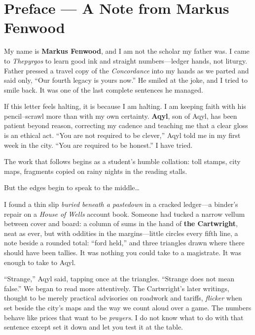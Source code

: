 \documentclass[11pt]{article}
\begin{document}
\section*{Preface — A Note from Markus Fenwood}
\label{sec:preface-markus}
{}

My name is \textbf{Markus Fenwood}, and I am not the scholar my father was. I came to \textit{Thepyrgos} to learn good ink and straight numbers—ledger hands, not liturgy. Father pressed a travel copy of the \emph{Concordance} into my hands as we parted and said only, ``Our fourth legacy is yours now.'' He smiled at the joke, and I tried to smile back. It was one of the last complete sentences he managed.

If this letter feels halting, it is because I am halting. I am keeping faith with his pencil--scrawl more than with my own certainty. \textbf{Aqyl}, son of Aqyl, has been patient beyond reason, correcting my cadence and teaching me that a clear gloss is an ethical act. ``You are not required to be clever,'' Aqyl told me in my first week in the city. ``You are required to be honest.'' I have tried.

The work that follows begins as a student's humble collation: toll stamps, city maps, fragments copied on rainy nights in the reading stalls.

But the edges begin to speak to the middle\ldots{}

I found a thin slip \textit{buried beneath a pastedown} in a cracked ledger—a binder's repair on a \textit{House of Wells} account book. Someone had tucked a narrow vellum between cover and board: a column of sums in the hand of \textbf{the Cartwright}, neat as ever, but with oddities in the margins—little circles every fifth line, a note beside a rounded total: ``ford held,'' and three triangles drawn where there should have been tallies. It was nothing you could take to a magistrate. It was enough to take to Aqyl.

``Strange,'' Aqyl said, tapping once at the triangles. ``Strange does not mean false.'' We began to read more attentively. The Cartwright's later writings, thought to be merely practical advisories on roadwork and tariffs, \textit{flicker} when set beside the city's maps and the way we count aloud over a game. The numbers behave like prices that want to be \textit{prayers}. I do not know what to do with that sentence except set it down and let you test it at the table.
\end{document}
